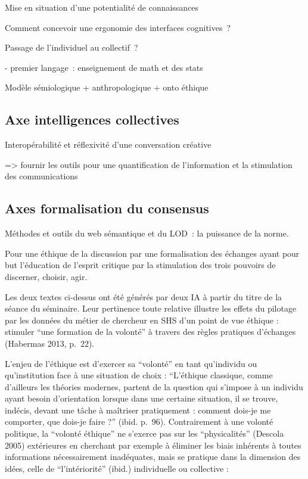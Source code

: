 \documentclass[
  letterpaper,
  DIV=11,
  numbers=noendperiod]{scrreprt}
\begin{document}
Mise en situation d'une potentialité de connaissances

Comment concevoir une ergonomie des interfaces cognitives~?

Passage de l'individuel au collectif~?

- premier langage~: enseignement de math et des stats

Modèle sémiologique + anthropologique + onto éthique

\hypertarget{sec-axeIntelCo}{%
\subsection{Axe intelligences collectives}\label{sec-axeIntelCo}}

Interopérabilité et réflexivité d'une conversation créative

=\textgreater{} fournir les outils pour une quantification de
l'information et la stimulation des communications

\hypertarget{sec-axeFormaConsensus}{%
\subsection{Axes formalisation du
consensus}\label{sec-axeFormaConsensus}}

Méthodes et outils du web sémantique et du LOD~: la puissance de la
norme.

Pour une éthique de la discussion par une formalisation des échanges
ayant pour but l'éducation de l'esprit critique par la stimulation des
trois pouvoirs de discerner, choisir, agir.

Les deux textes ci-dessus ont été générés par deux IA à partir du titre
de la séance du séminaire. Leur pertinence toute relative illustre les
effets du pilotage par les données du métier de chercheur en SHS d'un
point de vue éthique : stimuler ``une formation de la volonté'' à
travers des règles pratiques d'échanges (Habermas 2013, p.~22).

L'enjeu de l'éthique est d'exercer sa ``volonté'' en tant qu'individu ou
qu'institution face à une situation de choix : ``L'éthique classique,
comme d'ailleurs les théories modernes, partent de la question qui
s'impose à un individu ayant besoin d'orientation lorsque dans une
certaine situation, il se trouve, indécis, devant une tâche à maîtriser
pratiquement : comment dois-je me comporter, que dois-je faire ?''
(ibid. p.~96). Contrairement à une volonté politique, la ``volonté
éthique'' ne s'exerce pas sur les ``physicalités'' (Descola 2005)
extérieures en cherchant par exemple à éliminer les biais inhérents à
toutes informations nécessairement inadéquates, mais se pratique dans la
dimension des idées, celle de ``l'intériorité'' (ibid.) individuelle ou
collective :
\end{document}
